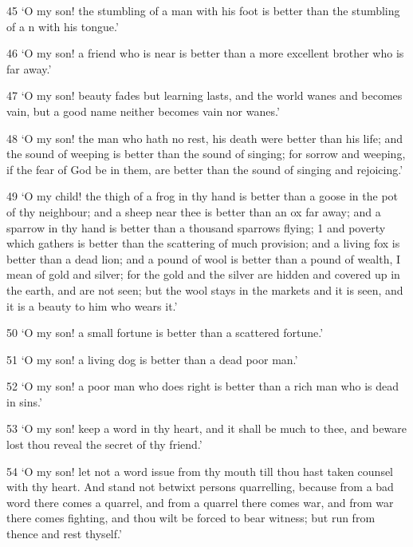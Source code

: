 \par 45 ‘O my son! the stumbling of a man with his foot is better than the stumbling of a n with his tongue.’

\par 46 ‘O my son! a friend who is near is better than a more excellent brother who is far away.’

\par 47 ‘O my son! beauty fades but learning lasts, and the world wanes and becomes vain, but a good name neither becomes vain nor wanes.’

\par 48 ‘O my son! the man who hath no rest, his death were better than his life; and the sound of weeping is better than the sound of singing; for sorrow and weeping, if the fear of God be in them, are better than the sound of singing and rejoicing.’

\par 49 ‘O my child! the thigh of a frog in thy hand is better than a goose in the pot of thy neighbour; and a sheep near thee is better than an ox far away; and a sparrow in thy hand is better than a thousand sparrows flying; 1 and poverty which gathers is better than the scattering of much provision; and a living fox is better than a dead lion; and a pound of wool is better than a pound of wealth, I mean of gold and silver; for the gold and the silver are hidden and covered up in the earth, and are not seen; but the wool stays in the markets and it is seen, and it is a beauty to him who wears it.’

\par 50 ‘O my son! a small fortune is better than a scattered fortune.’

\par 51 ‘O my son! a living dog is better than a dead poor man.’

\par 52 ‘O my son! a poor man who does right is better than a rich man who is dead in sins.’

\par 53 ‘O my son! keep a word in thy heart, and it shall be much to thee, and beware lost thou reveal the secret of thy friend.’

\par 54 ‘O my son! let not a word issue from thy mouth till thou hast taken counsel with thy heart. And stand not betwixt persons quarrelling, because from a bad word there comes a quarrel, and from a quarrel there comes war, and from war there comes fighting, and thou wilt be forced to bear witness; but run from thence and rest thyself.’

